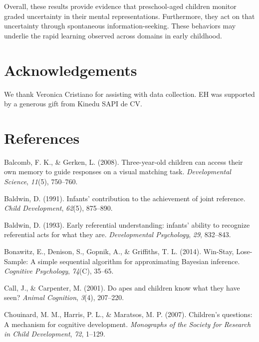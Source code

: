 \documentclass[a4paper,man,apacite,floatsintext]{apa6}
\begin{document}
Overall, these results provide evidence that preschool-aged children
monitor graded uncertainty in their mental representations. Furthermore,
they act on that uncertainty through spontaneous information-seeking.
These behaviors may underlie the rapid learning observed across domains
in early childhood.

\section{Acknowledgements}\label{acknowledgements}

We thank Veronica Cristiano for assisting with data collection. EH was
supported by a generous gift from Kinedu SAPI de CV.

\section{References}\label{references}

\setlength{\parindent}{-0.1in} \setlength{\leftskip}{0.125in} \noindent

\hypertarget{refs}{}
\hypertarget{ref-Balcomb2008}{}
Balcomb, F. K., \& Gerken, L. (2008). Three-year-old children can access
their own memory to guide responses on a visual matching task.
\emph{Developmental Science}, \emph{11}(5), 750--760.

\hypertarget{ref-Baldwin1991}{}
Baldwin, D. (1991). Infants' contribution to the achievement of joint
reference. \emph{Child Development}, \emph{62}(5), 875--890.

\hypertarget{ref-Baldwin1993}{}
Baldwin, D. (1993). Early referential understanding: infants' ability to
recognize referential acts for what they are. \emph{Developmental
Psychology}, \emph{29}, 832--843.

\hypertarget{ref-Bonawitz2014}{}
Bonawitz, E., Denison, S., Gopnik, A., \& Griffiths, T. L. (2014).
Win-Stay, Lose-Sample: A simple sequential algorithm for approximating
Bayesian inference. \emph{Cognitive Psychology}, \emph{74}(C), 35--65.

\hypertarget{ref-Call2001}{}
Call, J., \& Carpenter, M. (2001). Do apes and children know what they
have seen? \emph{Animal Cognition}, \emph{3}(4), 207--220.

\hypertarget{ref-Chouinard2007}{}
Chouinard, M. M., Harris, P. L., \& Maratsos, M. P. (2007). Children's
questions: A mechanism for cognitive development. \emph{Monographs of
the Society for Research in Child Development}, \emph{72}, 1--129.
\end{document}
